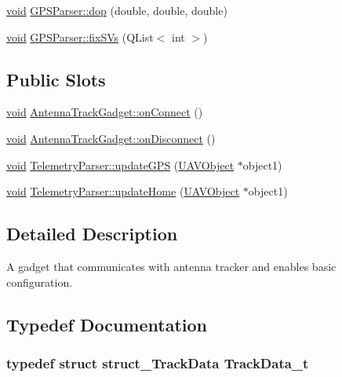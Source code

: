 \begin{DoxyCompactItemize}
\item 
\hyperlink{group___u_a_v_objects_plugin_ga444cf2ff3f0ecbe028adce838d373f5c}{void} \hyperlink{group___antenna_track_gadget_plugin_ga53672aaf2037c7a9b389c15e69bc4d80}{\-G\-P\-S\-Parser\-::dop} (double, double, double)
\item 
\hyperlink{group___u_a_v_objects_plugin_ga444cf2ff3f0ecbe028adce838d373f5c}{void} \hyperlink{group___antenna_track_gadget_plugin_gacd7414def0621beab61941370e0dc874}{\-G\-P\-S\-Parser\-::fix\-S\-Vs} (\-Q\-List$<$ int $>$)
\end{DoxyCompactItemize}
\subsection*{\-Public \-Slots}
\begin{DoxyCompactItemize}
\item 
\hyperlink{group___u_a_v_objects_plugin_ga444cf2ff3f0ecbe028adce838d373f5c}{void} \hyperlink{group___antenna_track_gadget_plugin_ga900506724dae73384f80ed883f037588}{\-Antenna\-Track\-Gadget\-::on\-Connect} ()
\item 
\hyperlink{group___u_a_v_objects_plugin_ga444cf2ff3f0ecbe028adce838d373f5c}{void} \hyperlink{group___antenna_track_gadget_plugin_ga2732f0141e7e02dc548535a3a87965a6}{\-Antenna\-Track\-Gadget\-::on\-Disconnect} ()
\item 
\hyperlink{group___u_a_v_objects_plugin_ga444cf2ff3f0ecbe028adce838d373f5c}{void} \hyperlink{group___antenna_track_gadget_plugin_ga9b1c1509701c154ad1c3cdeef0cb522b}{\-Telemetry\-Parser\-::update\-G\-P\-S} (\hyperlink{class_u_a_v_object}{\-U\-A\-V\-Object} $\ast$object1)
\item 
\hyperlink{group___u_a_v_objects_plugin_ga444cf2ff3f0ecbe028adce838d373f5c}{void} \hyperlink{group___antenna_track_gadget_plugin_ga0e7bcbaf20beede5d60913dc50505465}{\-Telemetry\-Parser\-::update\-Home} (\hyperlink{class_u_a_v_object}{\-U\-A\-V\-Object} $\ast$object1)
\end{DoxyCompactItemize}


\subsection{\-Detailed \-Description}
\-A gadget that communicates with antenna tracker and enables basic configuration. 

\subsection{\-Typedef \-Documentation}
\hypertarget{group___antenna_track_gadget_plugin_ga2a189738d52fd5df21e4a823d19ad1ac}{
\subsubsection[{\-Track\-Data\-\_\-t}]{\setlength{\rightskip}{0pt plus 5cm}typedef struct {\bf struct\-\_\-\-Track\-Data} {\bf \-Track\-Data\-\_\-t}}}\label{group___antenna_track_gadget_plugin_ga2a189738d52fd5df21e4a823d19ad1ac}



